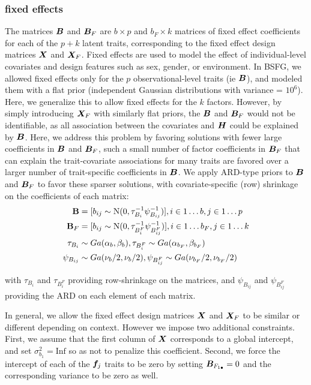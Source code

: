 \documentclass[11pt]{amsart}
\newcommand*{\B}[1]{\ifmmode\bm{#1}\else\textbf{#1}\fi}
\begin{document}
\subsubsection{fixed effects}
The matrices $\B{B}$ and $\B{B}_F$ are $b \times p$ and $b_F \times k$ matrices of fixed effect coefficients for each of the $p + k$ latent traits, corresponding to the fixed effect design matrices $\B{X}$ and $\B{X}_F$. Fixed effects are used to model the effect of individual-level covariates and design features such as sex, gender, or environment. In BSFG, we allowed fixed effects only for the $p$ observational-level traits (ie $\B{B}$), and modeled them with a flat prior (independent Gaussian distributions with variance = $10^6$). Here, we generalize this to allow fixed effects for the $k$ factors. However, by simply introducing $\B{X}_F$ with similarly flat priors, the $\B{B}$ and $\B{B}_F$ would not be identifiable, as all association between the covariates and $\B{H}$ could be explained by $\B{B}$. Here, we address this problem by favoring solutions with fewer large coefficients in $\B{B}$ and $\B{B}_F$, such a small number of factor coefficients in $\B{B}_F$ that can explain the trait-covariate associations for many traits are favored over a larger number of trait-specific coefficients in $\B{B}$. We apply ARD-type priors to $\B{B}$ and $\B{B}_F$ to favor these sparser solutions, with covariate-specific (row) shrinkage on the coefficients of each matrix:
\begin{align}\begin{split}
\B{B} &= [b_{ij} \sim \mbox{N}(0,\tau^{-1}_{B_i} \psi^{-1}_{B_{ij}})], i \in 1\dots b, j \in 1\dots p \\
\B{B}_F &= [b_{ij} \sim \mbox{N}(0,\tau^{-1}_{B^F_i} \psi^{-1}_{B^F_{ij}})], i \in 1\dots b_F, j \in 1\dots k\\
\tau_{B_i} &\sim Ga(\alpha_b, \beta_b), \tau_{B^F_i} \sim Ga(\alpha_{b_F}, \beta_{b_F}) \\
\psi_{B_{ij}} &\sim Ga(\nu_b/2, \nu_b/2), \psi_{B^F_{ij}} \sim Ga(\nu_{b_F}/2, \nu_{b_F}/2)
\end{split} \end{align}

\noindent with $\tau_{B_i}$ and $\tau_{B^F_i}$ providing row-shrinkage on the matrices, and $\psi_{B_{ij}}$ and $\psi_{B^F_{ij}}$ providing the ARD on each element of each matrix.

In general, we allow the fixed effect design matrices $\B{X}$ and $\B{X}_F$ to be similar or different depending on context. 
However we impose two additional constraints. First, we assume that the first column of $\B{X}$ corresponds to a global intercept, and set $\sigma^2_{b_1} = \mbox{Inf}$ so as not to penalize this coefficient. 
Second, we force the intercept of each of the $\B{f}_j$ traits to be zero by setting $\B{B}_{F_{1\bullet}} = 0$ and the corresponding variance to be zero as well.
\end{document}
